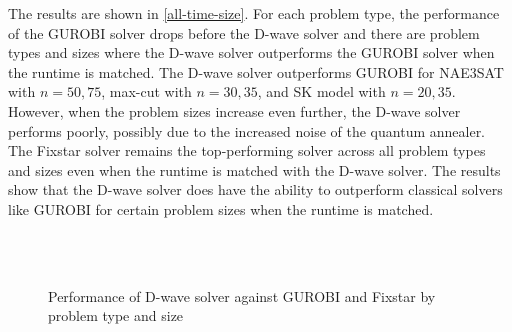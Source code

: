 The results are shown in \autoref{all-time-size}. For each problem type, the performance of the GUROBI solver drops before the D-wave solver and there are problem types and sizes where the D-wave solver outperforms the GUROBI solver when the runtime is matched. The D-wave solver outperforms GUROBI for NAE3SAT with $n=50, 75$, max-cut with $n=30,35$, and SK model with $n=20, 35$. However, when the problem sizes increase even further, the D-wave solver performs poorly, possibly due to the increased noise of the quantum annealer. The Fixstar solver remains the top-performing solver across all problem types and sizes even when the runtime is matched with the D-wave solver. The results show that the D-wave solver does have the ability to outperform classical solvers like GUROBI for certain problem sizes when the runtime is matched.

\begin{figure}[!htbp]
    \centering
    \\
    \\    
    \caption{Performance of D-wave solver against GUROBI and Fixstar by problem type and size}
    \label{all-time-size}
\end{figure}

